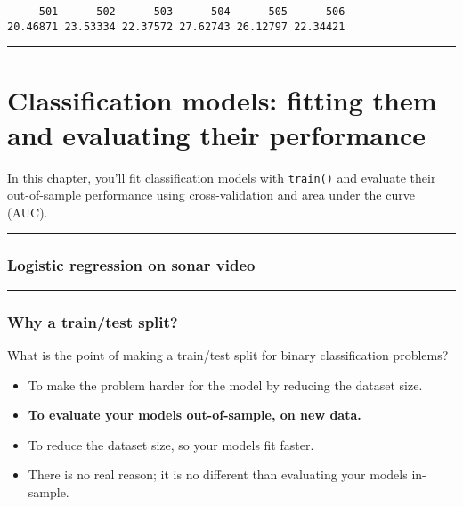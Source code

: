 \documentclass[
]{book}
\begin{document}
\begin{verbatim}
     501      502      503      504      505      506 
20.46871 23.53334 22.37572 27.62743 26.12797 22.34421 
\end{verbatim}

\begin{center}\rule{0.5\linewidth}{0.5pt}\end{center}

\hypertarget{classification-models-fitting-them-and-evaluating-their-performance}{%
\chapter{Classification models: fitting them and evaluating their performance}\label{classification-models-fitting-them-and-evaluating-their-performance}}

In this chapter, you'll fit classification models with \texttt{train()} and evaluate their out-of-sample performance using cross-validation and area under the curve (AUC).

\begin{center}\rule{0.5\linewidth}{0.5pt}\end{center}

\hypertarget{logistic-regression-on-sonar-video}{%
\subsection*{Logistic regression on sonar video}\label{logistic-regression-on-sonar-video}}

\begin{center}\rule{0.5\linewidth}{0.5pt}\end{center}

\hypertarget{why-a-traintest-split}{%
\subsection*{Why a train/test split?}\label{why-a-traintest-split}}

What is the point of making a train/test split for binary classification problems?

\begin{itemize}
\item
  To make the problem harder for the model by reducing the dataset size.
\item
  \textbf{To evaluate your models out-of-sample, on new data.}
\item
  To reduce the dataset size, so your models fit faster.
\item
  There is no real reason; it is no different than evaluating your models in-sample.
\end{itemize}
\end{document}
